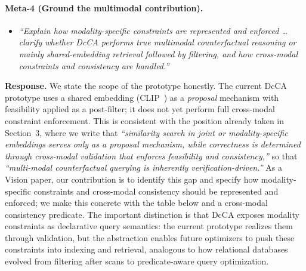 \paragraph{Meta-4 (Ground the multimodal contribution).}

\begin{itemize}[leftmargin=1.2em, itemsep=1pt, topsep=2pt]
\item \textit{``Explain how modality-specific constraints are represented and enforced \dots clarify whether DcCA performs true multimodal counterfactual reasoning or mainly shared-embedding retrieval followed by filtering, and how cross-modal constraints and consistency are handled.''}
\end{itemize}
\smallskip

\noindent\textbf{Response.}
We state the scope of the prototype honestly. The current DcCA prototype uses a shared embedding (CLIP~\cite{radford2021learning}) as a \emph{proposal} mechanism with feasibility applied as a post-filter; it does not yet perform full cross-modal constraint enforcement. This is consistent with the position already taken in Section~3, where we write that \emph{``similarity search in joint or modality-specific embeddings serves only as a proposal mechanism, while correctness is determined through cross-modal validation that enforces feasibility and consistency,''} so that \emph{``multi-modal counterfactual querying is inherently verification-driven.''} As a Vision paper, our contribution is to identify this gap and specify how modality-specific constraints and cross-modal consistency should be represented and enforced; we make this concrete with the table below and a cross-modal consistency predicate. The important distinction is that DcCA exposes modality constraints as declarative query semantics: the current prototype realizes them through validation, but the abstraction enables future optimizers to push these constraints into indexing and retrieval, analogous to how relational databases evolved from filtering after scans to predicate-aware query optimization.

